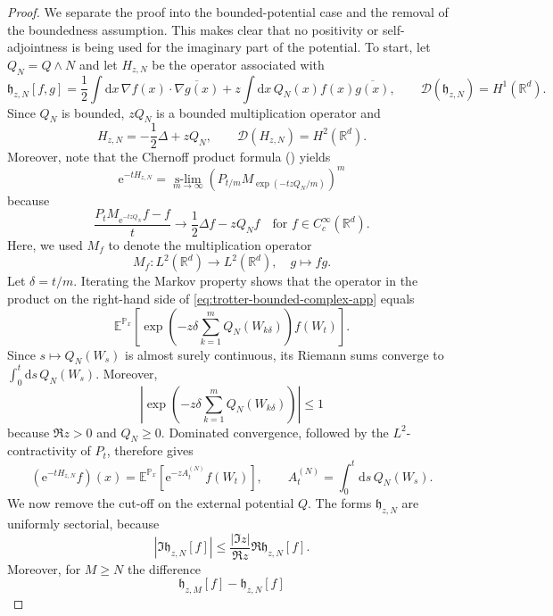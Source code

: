 \documentclass[11pt,reqno]{amsart}
\theoremstyle{definition}
\numberwithin{equation}{section}
\newcommand{\<}{\langle}
\renewcommand{\>}{\rangle}
\def\de{{\rm d}}
\def\prob{{\mathbb P}}
\def\de{{\mathrm {d}}}
\def\bbR{{\mathbb{R}}}
\begin{document}
\begin{appendix}
\begin{proof}
We separate the proof into the bounded-potential case and the removal of the
boundedness assumption.  This makes clear that no positivity or
self-adjointness is being used for the imaginary part of the potential.
To start, 
let $Q_N=Q\wedge N$ and let $H_{z,N}$ be the operator associated with
\[
  \mathfrak h_{z,N}[f,g]
  =\frac12\int \de x \, \nabla f(x)\cdot\overline{\nabla g(x)}
   +z\int \de x \,  Q_N (x) f (x) \overline{g(x)},
  \qquad \mathcal D(\mathfrak h_{z,N})=H^1(\mathbb R^d).
\]
Since $Q_N$ is bounded, $zQ_N$ is a bounded multiplication operator and
\[
        H_{z,N}=-\frac12\Delta+zQ_N,
        \qquad \mathcal D(H_{z,N})=H^2(\mathbb R^d).
\]
Moreover, note that the Chernoff product formula (\cite[Theorem III.5.3]{EngelNagelSemigroups}) yields
\begin{equation}
 \mathrm e^{-tH_{z,N}}
 =\operatorname*{s-lim}_{m\to\infty}
 \left(P_{t/m}M_{\exp(-tzQ_N/m)}\right)^m
 \label{eq:trotter-bounded-complex-app}
\end{equation}
because
\[
 \frac{P_tM_{\mathrm e^{-tzQ_N}}f-f}{t}
 \longrightarrow \frac12\Delta f-zQ_Nf
 \quad\text{for }f\in C_c^\infty(\mathbb R^d).
\]
Here, we used $M_f$ to denote the multiplication operator
\[M_f :L^2(\bbR^d) \to L^2(\bbR^d), \quad g \mapsto fg.\]
Let $\delta=t/m$.  Iterating the Markov property shows that the operator in
the product on the right-hand side of
\eqref{eq:trotter-bounded-complex-app} equals
\begin{equation}
 \mathbb E^{\prob_x}\left[
  \exp\left(-z\delta\sum_{k=1}^m Q_N(W_{k\delta})\right)f(W_t)
 \right].
 \nonumber
\end{equation}
Since $s\mapsto Q_N(W_s)$ is almost surely continuous, its Riemann sums
converge to $\int_0^t \de s \, Q_N(W_s)$.  Moreover,
\[
 \left|
  \exp\left(-z\delta\sum_{k=1}^mQ_N(W_{k\delta})\right)
 \right|
 \leq1
\]
because $\Re z>0$ and $Q_N\geq0$.  Dominated convergence,
followed by the $L^2$-contractivity of $P_t$, therefore gives
\begin{equation}
 (\mathrm e^{-tH_{z,N}}f)(x)
 =\mathbb E^{\prob_x}\left[
   \mathrm e^{-zA_t^{(N)}}f(W_t)
  \right],
 \qquad
 A_t^{(N)}=\int_0^t \de s \, Q_N(W_s).
 \nonumber
\end{equation}
We now remove the cut-off on the external potential $Q$.
The forms $\mathfrak h_{z,N}$ are uniformly sectorial, because
\[
 |\Im\mathfrak h_{z,N}[f]|
 \leq\frac{|\Im z|}{\Re z}
       \Re \mathfrak h_{z,N}[f].
\]
Moreover, for $M\geq N$ the difference
\[
 \mathfrak h_{z,M}[f]-\mathfrak h_{z,N}[f]
\]
\end{proof}
\end{appendix}
\end{document}
